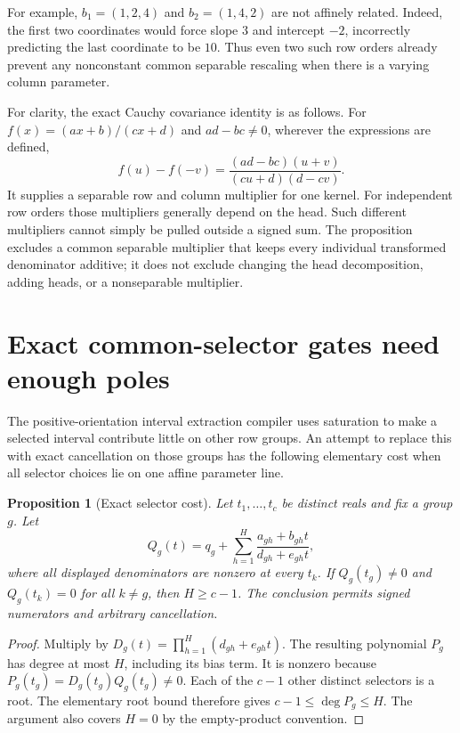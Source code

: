 \documentclass[11pt]{article}
\newtheorem{proposition}{Proposition}
\begin{document}
For example, $b_1=(1,2,4)$ and $b_2=(1,4,2)$ are not affinely related.
Indeed, the first two coordinates would force slope $3$ and intercept
$-2$, incorrectly predicting the last coordinate to be $10$.
Thus even two such row orders already prevent any nonconstant common
separable rescaling when there is a varying column parameter.

For clarity, the exact Cauchy covariance identity is as follows. For
$f(x)=(ax+b)/(cx+d)$ and $ad-bc\neq0$, wherever the expressions are
defined,
\[
 f(u)-f(-v)=\frac{(ad-bc)(u+v)}{(cu+d)(d-cv)}.
\]
It supplies a separable row and column multiplier for one kernel.
For independent row orders those multipliers generally depend on the
head. Such different multipliers cannot simply be pulled outside a
signed sum. The proposition excludes a common separable multiplier
that keeps every individual transformed denominator additive; it does
not exclude changing the head decomposition, adding heads, or a
nonseparable multiplier.

\section{Exact common-selector gates need enough poles}

The positive-orientation interval extraction compiler uses saturation to
make a selected interval contribute little on other row groups. An
attempt to replace this with exact cancellation on those groups has the
following elementary cost when all selector choices lie on one affine
parameter line.

\begin{proposition}[Exact selector cost]
Let $t_1,\ldots,t_c$ be distinct reals and fix a group $g$. Let
\[
 Q_g(t)=q_g+\sum_{h=1}^H\frac{a_{gh}+b_{gh}t}{d_{gh}+e_{gh}t},
\]
where all displayed denominators are nonzero at every $t_k$. If
$Q_g(t_g)\neq0$ and $Q_g(t_k)=0$ for all $k\neq g$, then $H\geq c-1$.
The conclusion permits signed numerators and arbitrary cancellation.
\end{proposition}
\begin{proof}
Multiply by $D_g(t)=\prod_{h=1}^H(d_{gh}+e_{gh}t)$. The resulting
polynomial $P_g$ has degree at most $H$, including its bias term.
It is nonzero because $P_g(t_g)=D_g(t_g)Q_g(t_g)\neq0$.
Each of the $c-1$ other distinct selectors is a root. The elementary
root bound therefore gives $c-1\leq\deg P_g\leq H$.
The argument also covers $H=0$ by the empty-product convention.
\end{proof}
\end{document}
